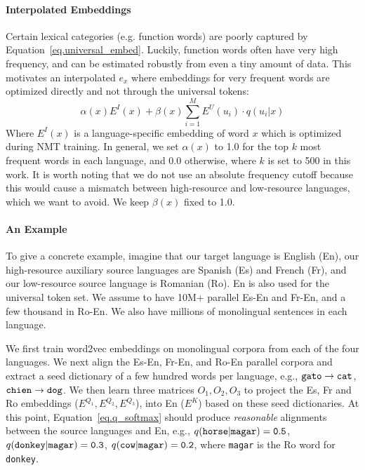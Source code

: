 \paragraph{Interpolated Embeddings}
Certain lexical categories (e.g. function words) are poorly captured by Equation~\ref{eq.universal_embed}. Luckily, function words often have very high frequency, and can be estimated robustly from even a tiny amount of data. This motivates an interpolated $e_x$ where embeddings for very frequent words are optimized directly and  not through the universal tokens:
\begin{equation}
	\alpha(x) E^I(x) + \beta(x) \sum_{i=1}^M E^U\left(u_i\right) \cdot q(u_i|x)
\end{equation}
Where $E^I(x)$ is a language-specific embedding of word $x$ which is optimized during NMT training. In general, we set $\alpha(x)$ to 1.0 for the top $k$ most frequent words in each language, and 0.0 otherwise, where $k$ is set to 500 in this work. It is worth noting that we do not use an absolute frequency cutoff because this would cause a mismatch between high-resource and low-resource languages, which we want to avoid. We keep $\beta(x)$ fixed to 1.0.

\paragraph{An Example} To give a concrete example, imagine that our target language is English (En), our high-resource auxiliary source languages are Spanish (Es) and French (Fr), and our low-resource source language is Romanian (Ro). En is also used for the universal token set. We assume to have 10M+ parallel Es-En and Fr-En, and a few thousand in Ro-En. We also have millions of monolingual sentences in each language.

We first train word2vec embeddings on monolingual corpora from each of the four languages. We next align the Es-En, Fr-En, and Ro-En parallel corpora and extract a seed dictionary of a few hundred words per language, e.g., ${\tt gato} \rightarrow {\tt cat}$,  ${\tt chien} \rightarrow {\tt dog}$. We then learn three matrices $O_1, O_2, O_3$ to project the Es, Fr and Ro embeddings ($E^{Q_1}, E^{Q_2}, E^{Q_3}$), into En ($E^K$) based on these seed dictionaries. At this point, Equation~\ref{eq.q_softmax} should produce \textit{reasonable} alignments between the source languages and En, e.g., $q(\tt{horse}|\tt{magar}) = 0.5$, $q(\tt{donkey}|\tt{magar}) = 0.3$, $q(\tt{cow}|\tt{magar}) = 0.2$, where {\tt magar} is the Ro word for {\tt donkey}. %

